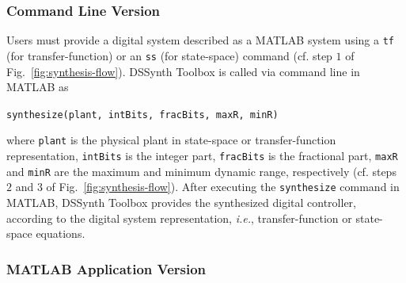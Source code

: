 \documentclass[10pt,conference]{IEEEtran}
\newcommand\tool{{DSSynth Toolbox}\xspace}
\begin{document}
\subsubsection{Command Line Version}

Users must provide a digital system described as a MATLAB system 
using a \texttt{tf} (for transfer-function) or an \texttt{ss} (for state-space) 
command (cf. step $1$ of Fig.~\ref{fig:synthesis-flow}).
\tool is called via command line in MATLAB as 

\begin{center} 
\texttt{synthesize(plant, intBits, fracBits, maxR, minR)}
\end{center} 

\noindent where \texttt{plant} is the physical plant in state-space or transfer-function representation, 
\texttt{intBits} is the integer part, \texttt{fracBits} is the fractional part, \texttt{maxR} and \texttt{minR} 
are the maximum and minimum dynamic range, respectively (cf. steps $2$ and $3$ of Fig.~\ref{fig:synthesis-flow}).
%
After executing the \texttt{synthesize} command in MATLAB, 
\tool provides the synthesized digital controller, according to 
the digital system representation, {\it i.e.}, transfer-function or 
state-space equations. 

\subsubsection{MATLAB Application Version} 
\end{document}
